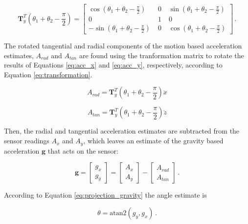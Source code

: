 \begin{equation}
\mathbf{T}^T_y(\theta_1 + \theta_2 - \frac{\pi}{2}) = \begin{bmatrix}
    \cos (\theta_1 + \theta_2 - \frac{\pi}{2}) \; & 0 \; & \sin (\theta_1 + \theta_2 - \frac{\pi}{2}) \\
    0 \; & 1 \; & 0 \\
    -\sin (\theta_1 + \theta_2 - \frac{\pi}{2}) \; & 0 \; & \cos (\theta_1 + \theta_2 - \frac{\pi}{2})
    \end{bmatrix}\,.
\end{equation}

\noindent
The rotated tangential and radial components of the motion based acceleration estimates, $A_{rad}$ and $A_{tan}$ are found using the tranformation matrix to rotate the results of Equations \ref{eq:acc_x} and \ref{eq:acc_y}, respectively, according to Equation \ref{eq:transformation}.

\begin{equation}
  A_{rad} = \mathbf{T}^T_y(\theta_1 + \theta_2 - \frac{\pi}{2}) \ddot{x}
\end{equation}

\begin{equation}
  A_{tan} = \mathbf{T}^T_y(\theta_1 + \theta_2 - \frac{\pi}{2}) \ddot{z}
\end{equation}

Then, the radial and tangential acceleration estimates are subtracted from the sensor readings $A_x$ and $A_y$, which leaves an estimate of the gravity based acceleration $\mathbf{g}$ that acts on the sensor:

\begin{equation}
\mathbf{g} = \begin{bmatrix}
    g_x \\
    g_y 
    \end{bmatrix} = 
    \begin{bmatrix}
    A_x \\
    A_y 
    \end{bmatrix} -
    \begin{bmatrix}
    A_{rad} \\
    A_{tan} 
    \end{bmatrix}\,.
\end{equation}

\noindent
According to Equation \ref{eq:projection_gravity} the angle estimate is

\begin{equation}
  \theta = \mbox{atan}2(g_y, g_x)\,.
\end{equation}

